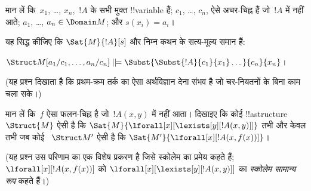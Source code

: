 \documentclass[../../../include/open-logic-section]{subfiles}
\begin{document}
\begin{prob}
\begin{enumerate}

\end{enumerate}
मान लें कि~$x_1$, \dots, $x_n$,~$!A$ के सभी मुक्त !!{variable} हैं;
$c_1$, \dots, $c_n$, ऐसे अचर-चिह्न हैं जो~$!A$ में नहीं आते;
$a_1$, \dots, $a_n \in \Domain M$; और $s(x_i) = a_i$।

यह सिद्ध कीजिए कि $\Sat{M}{!A}[s]$ और निम्न कथन के सत्य-मूल्य समान हैं:

$\Struct M[a_1/c_1,\dots,a_n/c_n]
\VDash \Subst{\Subst{!A}{c_1}{x_1}\dots}{c_n}{x_n}$।

(यह प्रश्न दिखाता है कि प्रथम-क्रम तर्क का ऐसा अर्थविज्ञान देना संभव है जो
चर-नियतनों के बिना काम चला सके।)
\end{prob}

\begin{prob}
मान लें कि~$f$ ऐसा फलन-चिह्न है जो~$!A(x,y)$ में नहीं आता। दिखाइए कि कोई
!!a{structure}~$\Struct{M}$ ऐसी है कि
$\Sat{M}{\lforall[x][\lexists[y][!A(x,y)]]}$ तभी और केवल तभी जब कोई
~$\Struct
M'$ ऐसी है कि $\Sat{M'}{\lforall[x][!A(x,f(x))]}$।

(यह प्रश्न उस परिणाम का एक विशेष प्रकरण है जिसे स्कोलेम का प्रमेय कहते हैं;
$\lforall[x][!A(x,f(x))]$ को
$\lforall[x][\lexists[y][!A(x,y)]]$ का \emph{स्कोलेम सामान्य रूप} कहते हैं।)
\end{prob}
\end{document}
